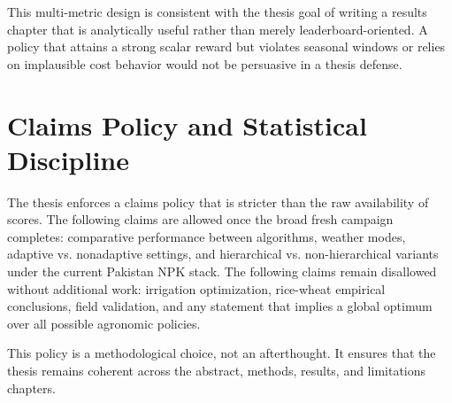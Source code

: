 This multi-metric design is consistent with the thesis goal of writing a results chapter that is analytically useful rather than merely leaderboard-oriented. A policy that attains a strong scalar reward but violates seasonal windows or relies on implausible cost behavior would not be persuasive in a thesis defense.

\section{Claims Policy and Statistical Discipline}

The thesis enforces a claims policy that is stricter than the raw availability of scores. The following claims are allowed once the broad fresh campaign completes: comparative performance between algorithms, weather modes, adaptive vs. nonadaptive settings, and hierarchical vs. non-hierarchical variants under the current Pakistan NPK stack. The following claims remain disallowed without additional work: irrigation optimization, rice-wheat empirical conclusions, field validation, and any statement that implies a global optimum over all possible agronomic policies.

This policy is a methodological choice, not an afterthought. It ensures that the thesis remains coherent across the abstract, methods, results, and limitations chapters.
